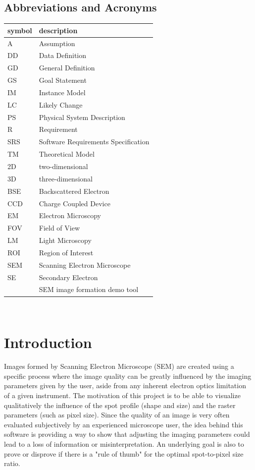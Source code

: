 \documentclass[12pt]{article}
\begin{document}
\subsection{Abbreviations and Acronyms}

\renewcommand{\arraystretch}{1.2}
\begin{tabular}{l l} 
  \toprule		
  \textbf{symbol} & \textbf{description}\\
  \midrule 
  A & Assumption\\
  DD & Data Definition\\
  GD & General Definition\\
  GS & Goal Statement\\
  IM & Instance Model\\
  LC & Likely Change\\
  PS & Physical System Description\\
  R & Requirement\\
  SRS & Software Requirements Specification\\
  TM & Theoretical Model\\
  2D & two-dimensional\\
  3D & three-dimensional\\
  BSE & Backscattered Electron\\
  CCD & Charge Coupled Device\\
  EM & Electron Microscopy\\
  FOV & Field of View\\
  LM & Light Microscopy\\
  ROI & Region of Interest\\
  SEM & Scanning Electron Microscope\\
  SE & Secondary Electron\\
  \progname{} & SEM image formation demo tool\\
  \bottomrule
\end{tabular}\\

\newpage


\section{Introduction}

Images formed by Scanning Electron Microscope (SEM) are created using a 
specific process where the image quality can be greatly influenced by the 
imaging parameters given by the user, aside from any inherent electron 
optics limitation of a given instrument. The motivation of this project is 
to be able to visualize qualitatively the influence of the spot profile 
(shape and size) and the raster parameters (such as pixel size). Since the 
quality of an image is very often evaluated subjectively by an experienced 
microscope user, the idea behind this software is providing a way to show 
that adjusting the imaging parameters could lead to a loss of information 
or misinterpretation. An underlying goal is also to prove or disprove if 
there is a "rule of thumb" for the optimal spot-to-pixel size ratio.
\end{document}
